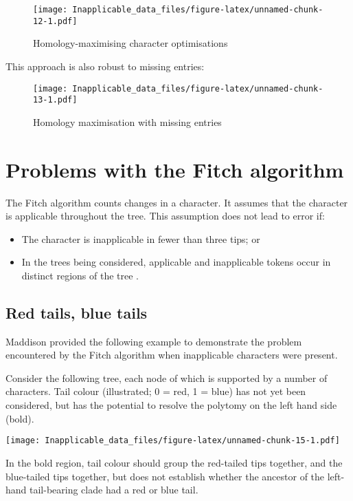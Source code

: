 \documentclass[]{book}
\theoremstyle{definition}
\theoremstyle{definition}
\theoremstyle{definition}
\theoremstyle{remark}
\begin{document}
\begin{figure}
\centering
\texttt{[image: Inapplicable\_data\_files/figure-latex/unnamed-chunk-12-1.pdf]}
\caption{\label{fig:unnamed-chunk-12}Homology-maximising character
optimisations}
\end{figure}

This approach is also robust to missing entries:

\begin{figure}
\centering
\texttt{[image: Inapplicable\_data\_files/figure-latex/unnamed-chunk-13-1.pdf]}
\caption{\label{fig:unnamed-chunk-13}Homology maximisation with missing
entries}
\end{figure}

\hypertarget{problems}{%
\chapter{Problems with the Fitch algorithm}\label{problems}}

The Fitch algorithm counts changes in a character. It assumes that the
character is applicable throughout the tree. This assumption does not
lead to error if:

\begin{itemize}
\item
  The character is inapplicable in fewer than three tips; or
\item
  In the trees being considered, applicable and inapplicable tokens
  occur in distinct regions of the tree \citep{Maddison1993}.
\end{itemize}

\hypertarget{red-tails-blue-tails}{%
\section{Red tails, blue tails}\label{red-tails-blue-tails}}

Maddison \citeyearpar{Maddison1993} provided the following example to
demonstrate the problem encountered by the Fitch algorithm when
inapplicable characters were present.

Consider the following tree, each node of which is supported by a number
of characters. Tail colour (illustrated; 0 = red, 1 = blue) has not yet
been considered, but has the potential to resolve the polytomy on the
left hand side (bold).

\texttt{[image: Inapplicable\_data\_files/figure-latex/unnamed-chunk-15-1.pdf]}

In the bold region, tail colour should group the red-tailed tips
together, and the blue-tailed tips together, but does not establish
whether the ancestor of the left-hand tail-bearing clade had a red or
blue tail.
\end{document}
